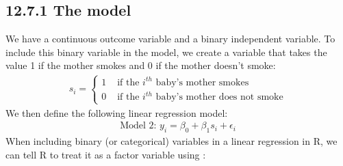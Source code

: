 \documentclass[letterpaper,10pt,english]{jupyterBook}
\begin{document}
\subsection{12.7.1 The model}
\label{\detokenize{12.h. Linear Regression I:the-model}}
\sphinxAtStartPar
We have a continuous outcome variable and a binary independent variable. To include this binary variable in the model, we create a  variable that takes the value 1 if the mother smokes and 0 if the mother doesn’t smoke:
\begin{equation*}
\begin{split} s_{i} = 
\begin{cases}
    1 & \text{ if the $i^{th}$ baby's mother smokes} \\
    0 & \text{ if the $i^{th}$ baby's mother does not smoke}
\end{cases} \end{split}
\end{equation*}
\sphinxAtStartPar
We then define the following linear regression model:
\begin{equation*}
\begin{split} 
\text{Model 2: } y_i = \beta_0 + \beta_1 s_i + \epsilon_i
\end{split}
\end{equation*}
\sphinxAtStartPar
When including binary (or categorical) variables in a linear regression in R, we can tell R to treat it as a factor variable using :

\begin{sphinxVerbatim}[commandchars=\\\{\}]
 
 
\end{sphinxVerbatim}
\end{document}
